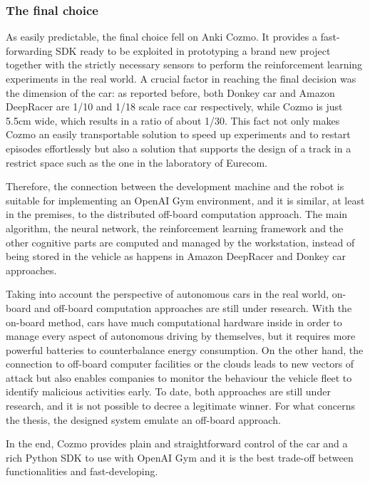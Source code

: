 \subsubsection{The final choice}

As easily predictable, the final choice fell on Anki Cozmo.
It provides a fast-forwarding SDK ready to be exploited in prototyping a brand new project together with the strictly necessary sensors to perform the reinforcement learning experiments in the real world.
A crucial factor in reaching the final decision was the dimension of the car: as reported before, both Donkey car and Amazon DeepRacer are 1/10 and 1/18 scale race car respectively, while Cozmo is just 5.5cm wide, which results in a ratio of about 1/30.
This fact not only makes Cozmo an easily transportable solution to speed up experiments and to restart episodes effortlessly but also a solution that supports the design of a track in a restrict space such as the one in the laboratory of Eurecom.

Therefore, the connection between the development machine and the robot is suitable for implementing an OpenAI Gym environment, and it is similar, at least in the premises, to the distributed off-board computation approach.
The main algorithm, the neural network, the reinforcement learning framework and the other cognitive parts are computed and managed by the workstation, instead of being stored in the vehicle as happens in Amazon DeepRacer and Donkey car approaches.

Taking into account the perspective of autonomous cars in the real world, on-board and off-board computation approaches are still under research.
With the on-board method, cars have much computational hardware inside in order to manage every aspect of autonomous driving by themselves, but it requires more powerful batteries to counterbalance energy consumption.
On the other hand, the connection to off-board computer facilities or the clouds leads to new vectors of attack but also enables companies to monitor the behaviour the vehicle fleet to identify malicious activities early.
To date, both approaches are still under research, and it is not possible to decree a legitimate winner.
For what concerns the thesis, the designed system emulate an off-board approach.

In the end, Cozmo provides plain and straightforward control of the car and a rich Python SDK to use with OpenAI Gym and it is the best trade-off between functionalities and fast-developing.


